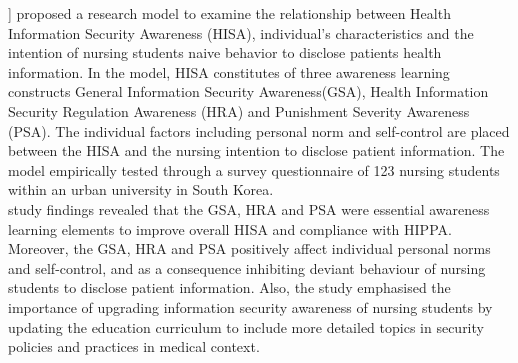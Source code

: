 \citet{Park2017} ] proposed a research model to examine the relationship between Health Information Security Awareness (HISA), individual’s characteristics and the intention of nursing students naive behavior to disclose patients health information. In the model, HISA constitutes of three awareness learning constructs General Information Security Awareness(GSA), Health Information Security Regulation Awareness (HRA) and Punishment Severity Awareness (PSA). The individual factors including personal norm and self-control are placed between the HISA and the nursing intention to disclose patient information. The model empirically tested through a survey questionnaire of 123 nursing students within an urban university in South Korea. \\
\citet{Park2017} study findings revealed that the GSA, HRA and PSA were essential awareness learning elements to improve overall HISA and compliance with HIPPA. Moreover, the GSA, HRA and PSA positively affect individual personal norms and self-control, and as a consequence inhibiting deviant behaviour of nursing students to disclose patient information. Also, the study emphasised the importance of upgrading information security awareness of nursing students by updating the education curriculum to include more detailed topics in security policies and practices in medical context.




